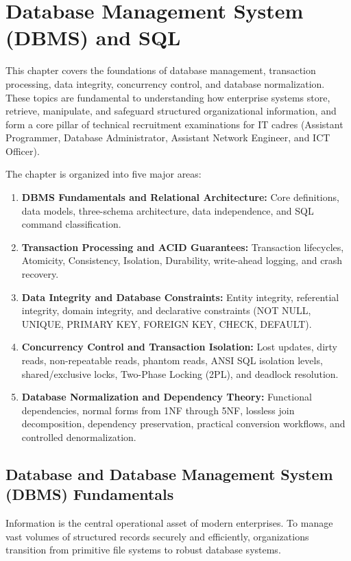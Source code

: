 
\chapter{Database Management System (DBMS) and SQL}
\label{ch:dbms_sql}

This chapter covers the foundations of database management, transaction processing, data integrity, concurrency control, and database normalization. These topics are fundamental to understanding how enterprise systems store, retrieve, manipulate, and safeguard structured organizational information, and form a core pillar of technical recruitment examinations for IT cadres (Assistant Programmer, Database Administrator, Assistant Network Engineer, and ICT Officer).

The chapter is organized into five major areas:
\begin{enumerate}
\item \textbf{DBMS Fundamentals and Relational Architecture:} Core definitions, data models, three-schema architecture, data independence, and SQL command classification.
\item \textbf{Transaction Processing and ACID Guarantees:} Transaction lifecycles, Atomicity, Consistency, Isolation, Durability, write-ahead logging, and crash recovery.
\item \textbf{Data Integrity and Database Constraints:} Entity integrity, referential integrity, domain integrity, and declarative constraints (NOT NULL, UNIQUE, PRIMARY KEY, FOREIGN KEY, CHECK, DEFAULT).
\item \textbf{Concurrency Control and Transaction Isolation:} Lost updates, dirty reads, non-repeatable reads, phantom reads, ANSI SQL isolation levels, shared/exclusive locks, Two-Phase Locking (2PL), and deadlock resolution.
\item \textbf{Database Normalization and Dependency Theory:} Functional dependencies, normal forms from 1NF through 5NF, lossless join decomposition, dependency preservation, practical conversion workflows, and controlled denormalization.
\end{enumerate}

\newpage
\section{Database and Database Management System (DBMS) Fundamentals}

Information is the central operational asset of modern enterprises. To manage vast volumes of structured records securely and efficiently, organizations transition from primitive file systems to robust database systems.

